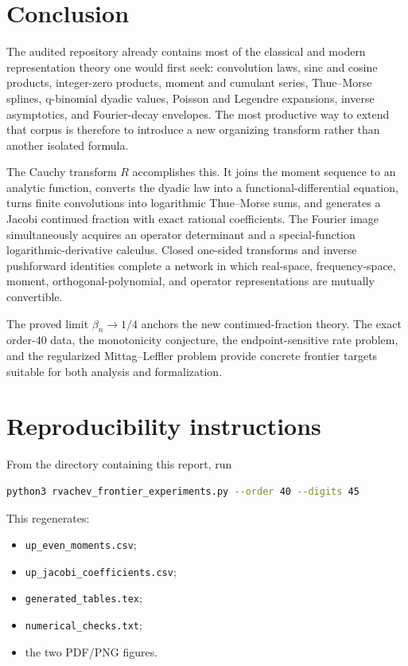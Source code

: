 \documentclass[11pt]{article}
\theoremstyle{definition}
\theoremstyle{remark}
\begin{document}
\section{Conclusion}

The audited repository already contains most of the classical and modern representation
theory one would first seek: convolution laws, sinc and cosine products, integer-zero
products, moment and cumulant series, Thue--Morse splines, q-binomial dyadic values,
Poisson and Legendre expansions, inverse asymptotics, and Fourier-decay envelopes.  The
most productive way to extend that corpus is therefore to introduce a new organizing
transform rather than another isolated formula.

The Cauchy transform \(R\) accomplishes this.  It joins the moment sequence to an analytic
function, converts the dyadic law into a functional-differential equation, turns finite
convolutions into logarithmic Thue--Morse sums, and generates a Jacobi continued fraction
with exact rational coefficients.  The Fourier image simultaneously acquires an operator
determinant and a special-function logarithmic-derivative calculus.  Closed one-sided
transforms and inverse pushforward identities complete a network in which real-space,
frequency-space, moment, orthogonal-polynomial, and operator representations are mutually
convertible.

The proved limit \(\beta_n\to1/4\) anchors the new continued-fraction theory.  The exact
order-40 data, the monotonicity conjecture, the endpoint-sensitive rate problem, and the
regularized Mittag--Leffler problem provide concrete frontier targets suitable for both
analysis and formalization.

\appendix

\section{Reproducibility instructions}\label{app:repro}

From the directory containing this report, run
\begin{lstlisting}[language=bash]
python3 rvachev_frontier_experiments.py --order 40 --digits 45
\end{lstlisting}
This regenerates:
\begin{itemize}
\item \texttt{up\_even\_moments.csv};
\item \texttt{up\_jacobi\_coefficients.csv};
\item \texttt{generated\_tables.tex};
\item \texttt{numerical\_checks.txt};
\item the two PDF/PNG figures.
\end{itemize}
\end{document}
